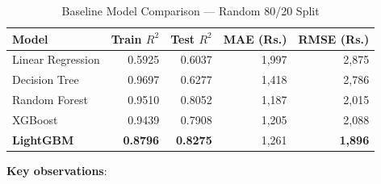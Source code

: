 \documentclass[12pt, a4paper]{article}
\begin{document}
\begin{table}[h]
\caption{Baseline Model Comparison --- Random 80/20 Split}
\label{tab:baseline}
\centering
\begin{tabular}{lrrrr}
\toprule
\textbf{Model} & \textbf{Train $R^2$} & \textbf{Test $R^2$} & \textbf{MAE (Rs.)} & \textbf{RMSE (Rs.)} \\
\midrule
Linear Regression      & 0.5925 & 0.6037 & 1{,}997 & 2{,}875 \\
Decision Tree          & 0.9697 & 0.6277 & 1{,}418 & 2{,}786 \\
Random Forest          & 0.9510 & 0.8052 & 1{,}187 & 2{,}015 \\
XGBoost                & 0.9439 & 0.7908 & 1{,}205 & 2{,}088 \\
\textbf{LightGBM}      & \textbf{0.8796} & \textbf{0.8275} & 1{,}261 & \textbf{1{,}896} \\
\bottomrule
\end{tabular}
\end{table}

\textbf{Key observations}:
\end{document}
